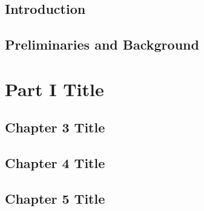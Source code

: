 \documentclass[12pt,a4paper,openright,notitlepage]{extreport}
\begin{document}
\printacronyms
\thispagestyle{empty}
\newpage

\setcounter{page}{1}
\pagestyle{fancy}

\chapter{Introduction}
\label{chap:chapter_1}


\chapter{Preliminaries and Background}
\label{chap:chapter_2}


\part{Part I Title}
\thispagestyle{empty}
\newpage
\blankpagewithnumber
\lhead{\fancyplain{}{}} %

\newpage
\blankpagewithnumber
\lhead{\fancyplain{}{\chaptername~ \thechapter}}

\chapter{Chapter 3 Title}
\label{chap:chapter_3}


\chapter{Chapter 4 Title}
\label{chap:chapter_4}


\chapter{Chapter 5 Title}
\label{chap:chapter_5}

\end{document}
